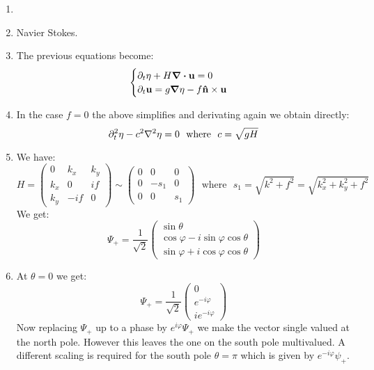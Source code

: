 \documentclass[10pt,a4paper]{book}
\begin{document}
\begin{enumerate}

\item 

\item Navier Stokes.

\item The previous equations become:
\[
\begin{cases}
\partial_t \eta + H \div \vb{u}  = 0\\
\partial_t \vb{u} = g \grad \eta - f \vu{n} \times \vb{u}
\end{cases}
\]

\item In the case $f = 0$ the above simplifies and derivating again we obtain directly:
\[
\partial_t^2 \eta - c^2 \laplacian \eta = 0 \mbox{~~where~~} c = \sqrt{g H}
\]

\item We have:
\[
H = \begin{pmatrix}
0 & k_x & k_y\\
k_x & 0 & if\\
k_y & -if & 0
\end{pmatrix}
\sim \begin{pmatrix}
0 & 0 & 0\\
0 & -s_1 & 0 \\
0 & 0 & s_1
\end{pmatrix}
\mbox{~~where~~} s_1 = \sqrt{k^2 + f^2} = \sqrt{k_x^2 + k_y^2 + f^2}
\]
We get:
\[
\Psi_+ = \frac{1}{\sqrt{2}} \begin{pmatrix}
\sin\theta\\
\cos \varphi - i \sin \varphi \cos \theta\\
\sin \varphi + i \cos \varphi \cos \theta
\end{pmatrix}
\]

\item At $\theta = 0$ we get:
\[
\Psi_+ = \frac{1}{\sqrt{2}} \begin{pmatrix}
0\\
e^{-i\varphi}\\
i e^{-i\varphi}
\end{pmatrix}
\]
Now replacing $\Psi_+$ up to a phase by $e^{i\varphi} \Psi_+$ we make the vector single valued at the north pole. However this leaves the one on the south pole multivalued. A different scaling is required for the south pole $\theta = \pi$ which is given by $e^{-i\varphi} \psi_+$. 


\end{enumerate}
\end{document}
